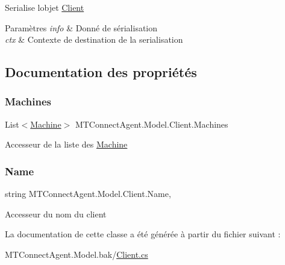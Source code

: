Serialise l\textquotesingle{}objet \mbox{\hyperlink{class_m_t_connect_agent_1_1_model_1_1_client}{Client}} 


\begin{DoxyParams}{Paramètres}
{\em info} & Donné de sérialisation\\
\hline
{\em ctx} & Contexte de destination de la serialisation\\
\hline
\end{DoxyParams}


\subsection{Documentation des propriétés}
\mbox{\label{class_m_t_connect_agent_1_1_model_1_1_client_a99571f570e22af5b1555ad37c2aa6d06}} 
\subsubsection{\texorpdfstring{Machines}{Machines}}
{\footnotesize\ttfamily List$<$\mbox{\hyperlink{class_m_t_connect_agent_1_1_model_1_1_machine}{Machine}}$>$ M\+T\+Connect\+Agent.\+Model.\+Client.\+Machines\hspace{0.3cm}{\ttfamily [get]}}



Accesseur de la liste des \mbox{\hyperlink{class_m_t_connect_agent_1_1_model_1_1_machine}{Machine}} 

\mbox{\label{class_m_t_connect_agent_1_1_model_1_1_client_ad3cab431fa147d3fbbd8ba015d6928bc}} 
\subsubsection{\texorpdfstring{Name}{Name}}
{\footnotesize\ttfamily string M\+T\+Connect\+Agent.\+Model.\+Client.\+Name\hspace{0.3cm}{\ttfamily [get]}, {\ttfamily [set]}}



Accesseur du nom du client 



La documentation de cette classe a été générée à partir du fichier suivant \+:\begin{DoxyCompactItemize}
\item 
M\+T\+Connect\+Agent.\+Model.\+bak/\mbox{\hyperlink{_client_8cs}{Client.\+cs}}\end{DoxyCompactItemize}

